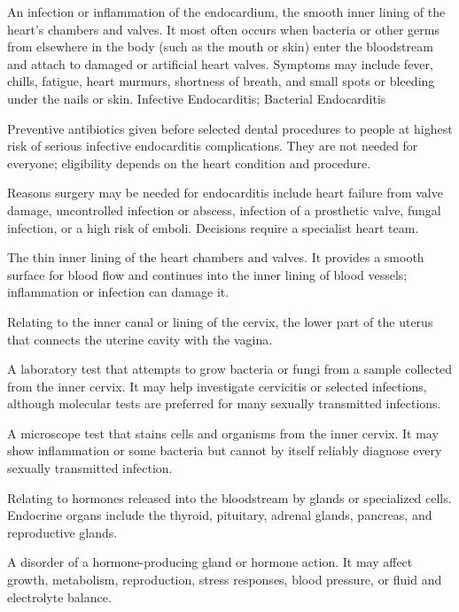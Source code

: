  An infection or inflammation of the endocardium, the smooth inner lining of the heart's chambers and valves. It most often occurs when bacteria or other germs from elsewhere in the body (such as the mouth or skin) enter the bloodstream and attach to damaged or artificial heart valves. Symptoms may include fever, chills, fatigue, heart murmurs, shortness of breath, and small spots or bleeding under the nails or skin.
\synonyms
Infective Endocarditis; Bacterial Endocarditis

 Preventive antibiotics given before selected dental procedures to people at highest risk of serious infective endocarditis complications. They are not needed for everyone; eligibility depends on the heart condition and procedure.

 Reasons surgery may be needed for endocarditis include heart failure from valve damage, uncontrolled infection or abscess, infection of a prosthetic valve, fungal infection, or a high risk of emboli. Decisions require a specialist heart team.

 The thin inner lining of the heart chambers and valves. It provides a smooth surface for blood flow and continues into the inner lining of blood vessels; inflammation or infection can damage it.

 Relating to the inner canal or lining of the cervix, the lower part of the uterus that connects the uterine cavity with the vagina.

 A laboratory test that attempts to grow bacteria or fungi from a sample collected from the inner cervix. It may help investigate cervicitis or selected infections, although molecular tests are preferred for many sexually transmitted infections.

 A microscope test that stains cells and organisms from the inner cervix. It may show inflammation or some bacteria but cannot by itself reliably diagnose every sexually transmitted infection.

 Relating to hormones released into the bloodstream by glands or specialized cells. Endocrine organs include the thyroid, pituitary, adrenal glands, pancreas, and reproductive glands.

 A disorder of a hormone-producing gland or hormone action. It may affect growth, metabolism, reproduction, stress responses, blood pressure, or fluid and electrolyte balance.

